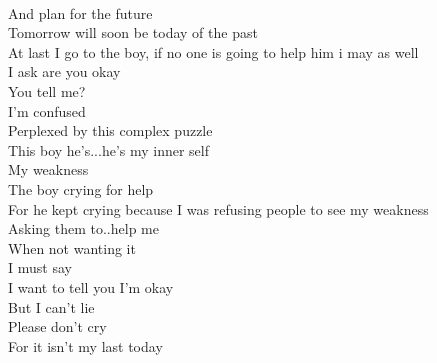 \documentclass[12pt, b5paper]{article}
\begin{document}
\\And plan for the future
\\Tomorrow will soon be today of the past
\\At last I go to the boy, if no one is going to help him i may as well
\\I ask are you okay
\\You tell me?
\\I'm confused
\\Perplexed by this complex puzzle
\\This boy he's...he's my inner self
\\My weakness
\\The boy crying for help
\\For he kept crying because I was refusing people to see my weakness
\\Asking them to..help me
\\When not wanting it
\\I must say
\\I want to tell you I'm okay
\\But I can't lie
\\Please don't cry
\\For it isn't my last today

\newpage 
\end{document}
